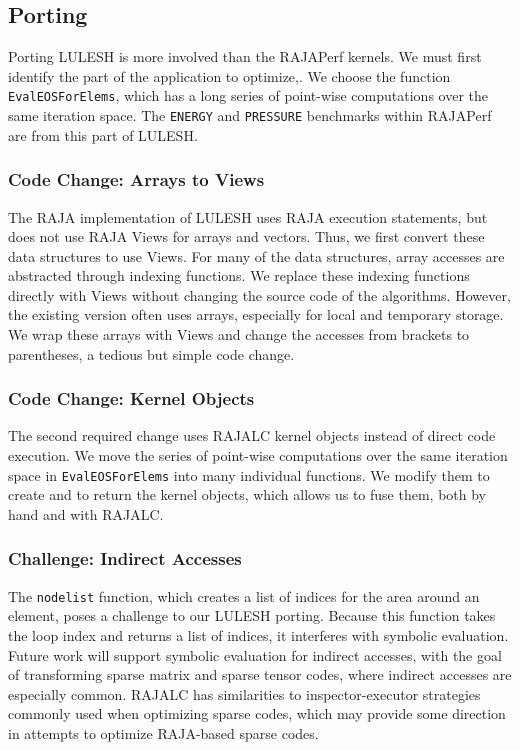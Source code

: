 \subsection{Porting}

Porting LULESH is more involved than the RAJAPerf kernels. 
We must first identify the part of the application to optimize,.
We choose the function \verb.EvalEOSForElems., which has a long series
of point-wise computations over the same iteration space.
The \verb.ENERGY. and \verb.PRESSURE. benchmarks within RAJAPerf are
from this part of LULESH.

\subsubsection{Code Change: Arrays to Views}

The RAJA implementation of LULESH uses RAJA execution statements, but
does not use RAJA Views for arrays and vectors. 
Thus, we first convert these data structures to use Views.
For many of the data structures, array accesses are abstracted through
indexing functions. 
We replace these indexing functions directly with Views without changing
the source code of the algorithms.
However, the existing version often uses arrays, especially for local and
temporary storage.
We wrap these arrays with Views and change the accesses from brackets to
parentheses, a tedious but simple code change.

\subsubsection{Code Change: Kernel Objects}

The second required change uses RAJALC kernel objects instead of direct
code execution.
We move the series of point-wise computations over the same iteration space
in \verb.EvalEOSForElems. into many individual functions.
We modify them to create and to return the kernel objects, which allows us
to fuse them, both by hand and with RAJALC.

\subsubsection{Challenge: Indirect Accesses}
The \verb.nodelist. function, which creates a list of indices for the area
around an element, poses a challenge to our LULESH porting.
Because this function takes the loop index and returns a list of indices,
it interferes with symbolic evaluation.
Future work will support symbolic evaluation for indirect accesses, with the
goal of transforming sparse matrix and sparse tensor codes, where indirect
accesses are especially common.
RAJALC has similarities to inspector-executor strategies commonly used when optimizing sparse codes, which may provide some direction in attempts to optimize RAJA-based sparse codes. 

